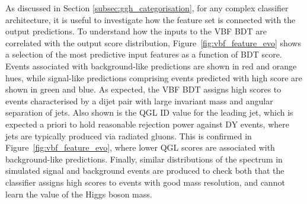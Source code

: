 As discussed in Section \ref{subsec:ggh_categorisation}, for any complex classifier architecture, it is useful to investigate how the feature set is connected with the output predictions.
To understand how the inputs to the VBF BDT are correlated with the output score distribution, Figure~\ref{fig:vbf_feature_evo} shows a selection of the most predictive input features as a function of BDT score. Events associated with background-like predictions are shown in red and orange hues, while signal-like predictions comprising events predicted with high score are shown in green and blue. 
As expected, the VBF BDT assigns high scores to events characterised by a dijet pair with large invariant mass and angular separation of jets.
Also shown is the QGL ID value for the leading jet, which is expected a priori to hold reasonable rejection power against DY events, where jets are typically produced via radiated gluons. This is confirmed in Figure~\ref{fig:vbf_feature_evo}, where lower QGL scores are associated with background-like predictions.
Finally, similar distributions of the \mee spectrum in simulated signal and background events are produced to check both that the classifier assigns high scores to events with good mass resolution, and cannot learn the value of the Higgs boson mass.

